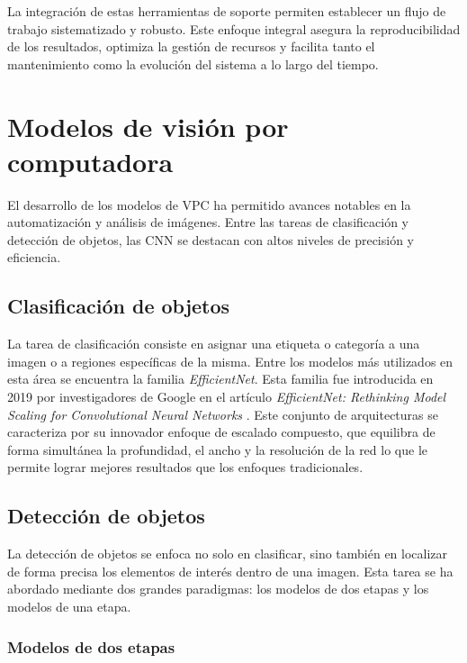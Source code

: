 La integración de estas herramientas de soporte permiten establecer un flujo de trabajo sistematizado y robusto. Este enfoque integral asegura la reproducibilidad de los resultados, optimiza la gestión de recursos y facilita tanto el mantenimiento como la evolución del sistema a lo largo del tiempo.

\section{Modelos de visión por computadora} \label{sec:modelosVisPC}

El desarrollo de los modelos de VPC ha permitido avances notables en la automatización y análisis de imágenes. Entre las tareas de clasificación y detección de objetos, las CNN se destacan con altos niveles de precisión y eficiencia.

\subsection{Clasificación de objetos}

La tarea de clasificación consiste en asignar una etiqueta o categoría a una imagen o a regiones específicas de la misma. Entre los modelos más utilizados en esta área se encuentra la familia \textit{EfficientNet}. Esta familia fue introducida en 2019 por investigadores de Google en el artículo \textit{EfficientNet: Rethinking Model Scaling for Convolutional Neural Networks} \citep{tan_efficientnet_2020}. Este conjunto de arquitecturas se caracteriza por su innovador enfoque de escalado compuesto, que equilibra de forma simultánea la profundidad, el ancho y la resolución de la red lo que le permite lograr mejores resultados que los enfoques tradicionales.

\subsection{Detección de objetos}

La detección de objetos se enfoca no solo en clasificar, sino también en localizar de forma precisa los elementos de interés dentro de una imagen. Esta tarea se ha abordado mediante dos grandes paradigmas: los modelos de dos etapas y los modelos de una etapa.

\subsubsection{Modelos de dos etapas}

